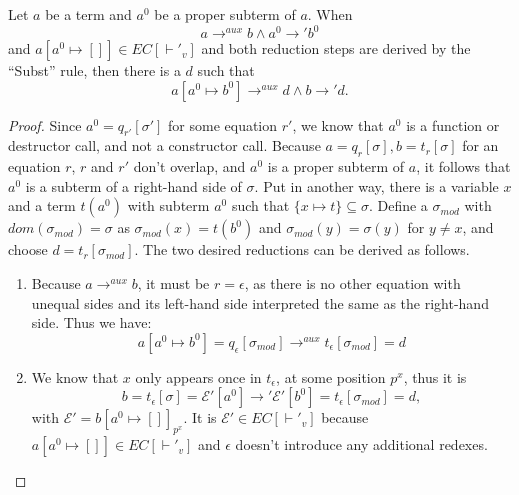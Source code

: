 \begin{lemma}
Let $a$ be a term and $a^0$ be a proper subterm of $a$. When
\[
a \longrightarrow^{aux} b \land a^0 \longrightarrow' b^0
\]
and $a[a^0 \mapsto []] \in EC[\vdash'_v]$ and both reduction steps are derived by the ``Subst'' rule, then there is a $d$ such that
\[
a[a^0 \mapsto b^0] \longrightarrow^{aux} d \land b \longrightarrow' d.
\]

\begin{proof}
Since $a^0 = q_{r'}[\sigma']$ for some equation $r'$, we know that $a^0$ is a function or destructor call, and not a constructor call. Because $a = q_r[\sigma], b = t_r[\sigma]$ for an equation $r$, $r$ and $r'$ don't overlap, and $a^0$ is a proper subterm of $a$, it follows that $a^0$ is a subterm of a right-hand side of $\sigma$. Put in another way, there is a variable $x$ and a term $t(a^0)$ with subterm $a^0$ such that $\{x \mapsto t\} \subseteq \sigma$. Define a $\sigma_{mod}$ with $dom(\sigma_{mod}) = \sigma$ as $\sigma_{mod}(x) = t(b^0)$ and $\sigma_{mod}(y) = \sigma(y)$ for $y \neq x$, and choose $d = t_r[\sigma_{mod}]$. The two desired reductions can be derived as follows.
\begin{enumerate}
\item Because $a \longrightarrow^{aux} b$, it must be $r = \epsilon$, as there is no other equation with unequal sides and its left-hand side interpreted the same as the right-hand side. Thus we have:
\[
a[a^0 \mapsto b^0] = q_\epsilon[\sigma_{mod}] \longrightarrow^{aux} t_\epsilon[\sigma_{mod}] = d
\]

\item
We know that $x$ only appears once in $t_\epsilon$, at some position $p^x$, thus it is
\[
b = t_\epsilon[\sigma] = \mathcal{E}'[a^0] \longrightarrow' \mathcal{E}'[b^0] = t_\epsilon[\sigma_{mod}] = d,
\]
with $\mathcal{E}' = b[a^0 \mapsto []]_{p^x}$. It is $\mathcal{E}' \in EC[\vdash'_v]$ because $a[a^0 \mapsto []] \in EC[\vdash'_v]$ and $\epsilon$ doesn't introduce any additional redexes.

\end{enumerate}
\end{proof}
\end{lemma}

